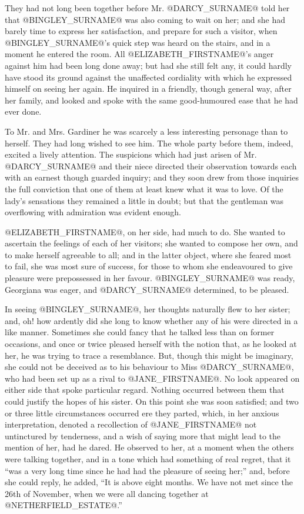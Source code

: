 They had not long been together before Mr. @DARCY_SURNAME@ told her that @BINGLEY_SURNAME@
was also coming to wait on her; and she had barely time to express her
satisfaction, and prepare for such a visitor, when @BINGLEY_SURNAME@'s quick
step was heard on the stairs, and in a moment he entered the room. All
@ELIZABETH_FIRSTNAME@'s anger against him had been long done away; but had she still
felt any, it could hardly have stood its ground against the unaffected
cordiality with which he expressed himself on seeing her again. He
inquired in a friendly, though general way, after her family, and looked
and spoke with the same good-humoured ease that he had ever done.

To Mr. and Mrs. Gardiner he was scarcely a less interesting personage
than to herself. They had long wished to see him. The whole party before
them, indeed, excited a lively attention. The suspicions which had just
arisen of Mr. @DARCY_SURNAME@ and their niece directed their observation towards
each with an earnest though guarded inquiry; and they soon drew from
those inquiries the full conviction that one of them at least knew
what it was to love. Of the lady's sensations they remained a little
in doubt; but that the gentleman was overflowing with admiration was
evident enough.

@ELIZABETH_FIRSTNAME@, on her side, had much to do. She wanted to ascertain the
feelings of each of her visitors; she wanted to compose her own, and
to make herself agreeable to all; and in the latter object, where she
feared most to fail, she was most sure of success, for those to whom she
endeavoured to give pleasure were prepossessed in her favour. @BINGLEY_SURNAME@
was ready, Georgiana was eager, and @DARCY_SURNAME@ determined, to be pleased.

In seeing @BINGLEY_SURNAME@, her thoughts naturally flew to her sister; and, oh!
how ardently did she long to know whether any of his were directed in
a like manner. Sometimes she could fancy that he talked less than on
former occasions, and once or twice pleased herself with the notion
that, as he looked at her, he was trying to trace a resemblance. But,
though this might be imaginary, she could not be deceived as to his
behaviour to Miss @DARCY_SURNAME@, who had been set up as a rival to @JANE_FIRSTNAME@. No look
appeared on either side that spoke particular regard. Nothing occurred
between them that could justify the hopes of his sister. On this point
she was soon satisfied; and two or three little circumstances occurred
ere they parted, which, in her anxious interpretation, denoted a
recollection of @JANE_FIRSTNAME@ not untinctured by tenderness, and a wish of saying
more that might lead to the mention of her, had he dared. He observed
to her, at a moment when the others were talking together, and in a tone
which had something of real regret, that it ``was a very long time since
he had had the pleasure of seeing her;'' and, before she could reply,
he added, ``It is above eight months. We have not met since the 26th of
November, when we were all dancing together at @NETHERFIELD_ESTATE@.''

